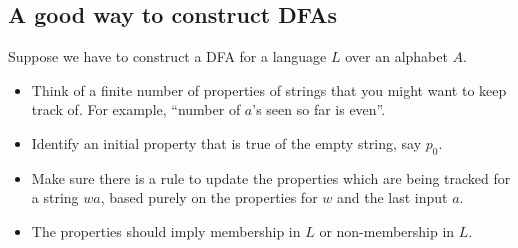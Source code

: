 \subsection{A good way to construct DFAs} \label{sec:dfa:ideas}
Suppose we have to construct a DFA for a language $L$ over an alphabet $A$.
\begin{itemize}
    \item Think of a finite number of properties of strings that you might
    want to keep track of.
    For example, ``number of $a$'s seen so far is even''.
    \item Identify an initial property that is true of the empty string,
    say $p_0$.
    \item Make sure there is a rule to update the properties which are being
    tracked for a string $wa$, based purely on the properties for $w$ and
    the last input $a$.
    \item The properties should imply membership in $L$ or non-membership
    in $L$.
\end{itemize}

